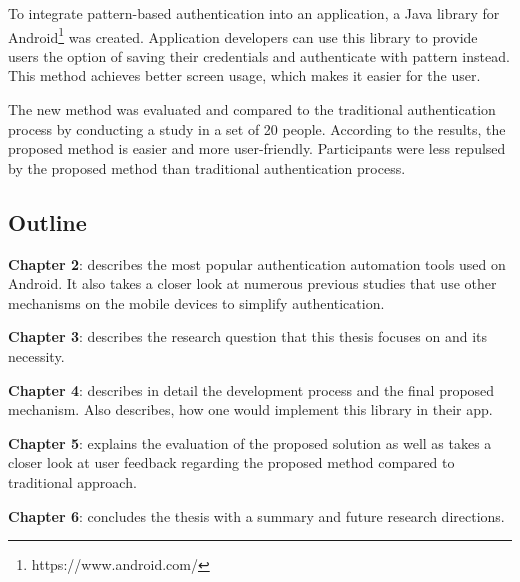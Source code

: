 To integrate pattern-based authentication into an application, a Java library for Android\footnote[3]{https://www.android.com/} was created. Application developers can use this library to provide users the option of saving their credentials and authenticate with pattern instead. This method achieves better screen usage, which makes it easier for the user. 

The new method was evaluated and compared to the traditional authentication process by conducting a study in a set of 20 people. According to the results, the proposed method is easier and more user-friendly. Participants were less repulsed by the proposed method than traditional authentication process.

\subsection{Outline}
\noindent \textbf{Chapter 2}: describes the most popular authentication automation tools used on Android. It also takes a closer look at numerous previous studies that use other mechanisms on the mobile devices to simplify authentication.

\noindent \textbf{Chapter 3}: describes the research question that this thesis focuses on and its necessity.

\noindent \textbf{Chapter 4}: describes in detail the development process and the final proposed mechanism. Also describes, how one would implement this library in their app.

\noindent \textbf{Chapter 5}: explains the evaluation of the proposed solution as well as takes a closer look at user feedback regarding the proposed method compared to traditional approach.

\noindent \textbf{Chapter 6}: concludes the thesis with a summary and future research directions.
